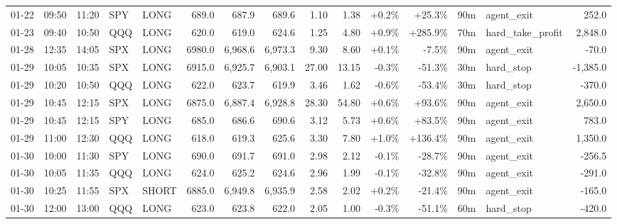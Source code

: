 \documentclass[11pt,a4paper,twoside]{article}
\begin{document}
\begin{landscape}
\begin{center}
\begin{longtable}{>{\color{txtmain}}l l l l l r r r r r r r r >{\color{txtmain}}l r}
01-22 & 09:50 & 11:20 & SPY & LONG & 689.0 & 687.9 & 689.6 & 1.10 & 1.38 & \textcolor{wingreen}{+0.2\%} & \textcolor{wingreen}{+25.3\%} & 90m & agent\_exit & \textcolor{wingreen}{252.0} \\
01-23 & 09:40 & 10:50 & QQQ & LONG & 620.0 & 619.0 & 624.6 & 1.25 & 4.80 & \textcolor{wingreen}{+0.9\%} & \textcolor{wingreen}{+285.9\%} & 70m & hard\_take\_profit & \textcolor{wingreen}{2,848.0} \\
01-28 & 12:35 & 14:05 & SPX & LONG & 6980.0 & 6,968.6 & 6,973.3 & 9.30 & 8.60 & \textcolor{wingreen}{+0.1\%} & \textcolor{lossred}{-7.5\%} & 90m & agent\_exit & \textcolor{lossred}{-70.0} \\
01-29 & 10:05 & 10:35 & SPX & LONG & 6915.0 & 6,925.7 & 6,903.1 & 27.00 & 13.15 & \textcolor{lossred}{-0.3\%} & \textcolor{lossred}{-51.3\%} & 30m & hard\_stop & \textcolor{lossred}{-1,385.0} \\
01-29 & 10:20 & 10:50 & QQQ & LONG & 622.0 & 623.7 & 619.9 & 3.46 & 1.62 & \textcolor{lossred}{-0.6\%} & \textcolor{lossred}{-53.4\%} & 30m & hard\_stop & \textcolor{lossred}{-370.0} \\
01-29 & 10:45 & 12:15 & SPX & LONG & 6875.0 & 6,887.4 & 6,928.8 & 28.30 & 54.80 & \textcolor{wingreen}{+0.6\%} & \textcolor{wingreen}{+93.6\%} & 90m & agent\_exit & \textcolor{wingreen}{2,650.0} \\
01-29 & 10:45 & 12:15 & SPY & LONG & 685.0 & 686.6 & 690.6 & 3.12 & 5.73 & \textcolor{wingreen}{+0.6\%} & \textcolor{wingreen}{+83.5\%} & 90m & agent\_exit & \textcolor{wingreen}{783.0} \\
01-29 & 11:00 & 12:30 & QQQ & LONG & 618.0 & 619.3 & 625.6 & 3.30 & 7.80 & \textcolor{wingreen}{+1.0\%} & \textcolor{wingreen}{+136.4\%} & 90m & agent\_exit & \textcolor{wingreen}{1,350.0} \\
01-30 & 10:00 & 11:30 & SPY & LONG & 690.0 & 691.7 & 691.0 & 2.98 & 2.12 & \textcolor{lossred}{-0.1\%} & \textcolor{lossred}{-28.7\%} & 90m & agent\_exit & \textcolor{lossred}{-256.5} \\
01-30 & 10:05 & 11:35 & QQQ & LONG & 624.0 & 625.2 & 624.6 & 2.96 & 1.99 & \textcolor{lossred}{-0.1\%} & \textcolor{lossred}{-32.8\%} & 90m & agent\_exit & \textcolor{lossred}{-291.0} \\
01-30 & 10:25 & 11:55 & SPX & SHORT & 6885.0 & 6,949.8 & 6,935.9 & 2.58 & 2.02 & \textcolor{wingreen}{+0.2\%} & \textcolor{lossred}{-21.4\%} & 90m & agent\_exit & \textcolor{lossred}{-165.0} \\
01-30 & 12:00 & 13:00 & QQQ & LONG & 623.0 & 623.8 & 622.0 & 2.05 & 1.00 & \textcolor{lossred}{-0.3\%} & \textcolor{lossred}{-51.1\%} & 60m & hard\_stop & \textcolor{lossred}{-420.0} \\

\end{longtable}
\end{center}
\end{landscape}
\end{document}
